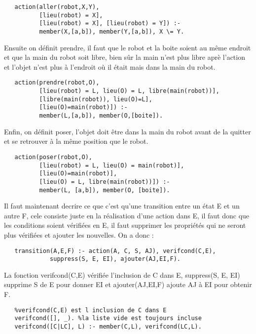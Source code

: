 \documentclass[a4paper,10pt]{article}
\begin{document}
  \begin{lstlisting}
   action(aller(robot,X,Y), 
          [lieu(robot) = X], 
          [lieu(robot) = X], [lieu(robot) = Y]) :-
	      member(X,[a,b]), member(Y,[a,b]), X \= Y.
  \end{lstlisting}
  
  Ensuite on d\'{e}finit prendre, il faut que le robot et la boite soient au m\^{e}me endroit et que la main du robot soit libre, bien s\^{u}r
  la main n'est plus libre apr\`{e} l'action et l'objet n'est plus \`{a} l'endroit o\`{u} il \'{e}tait mais dans la main du robot.
  
  \begin{lstlisting}
   action(prendre(robot,O), 
          [lieu(robot) = L, lieu(O) = L, libre(main(robot))], 
          [libre(main(robot)), lieu(O)=L], 
          [lieu(O)=main(robot)]) :-
	      member(L,[a,b]), member(O,[boite]).
  \end{lstlisting}
  
  Enfin, on d\'{e}finit poser, l'objet doit \^{e}tre dans la main du robot avant de la quitter et se retrouver \`{a} la m\^{e}me position que le robot.
  
  \begin{lstlisting}
   action(poser(robot,O), 
          [lieu(robot) = L, lieu(O) = main(robot)], 
          [lieu(O)=main(robot)], 
          [lieu(O) = L, libre(main(robot))]) :- 
	      member(L, [a,b]), member(O, [boite]).
  \end{lstlisting}
  
  Il faut maintenant decrire ce que c'est qu'une transition entre un \'{e}tat E et un autre F, cele consiste juste en la réalisation d'une action dans
  E, il faut donc que les conditions soient v\'{e}rifi\'{e}es en E, il faut supprimer les propri\'{e}t\'{e}s qui ne seront plus v\'{e}rifi\'{e}es et 
  ajouter les nouvelles. On a donc :
  
  \begin{lstlisting}
   transition(A,E,F) :- action(A, C, S, AJ), verifcond(C,E), 
			 suppress(S, E, EI), ajouter(AJ,EI,F).
  \end{lstlisting}
  
  La fonction verifcond(C,E) v\'{e}rifi\'{e}e l'inclusion de C dans E, suppress(S, E, EI) supprime S de E pour donner EI et ajouter(AJ,EI,F)
  ajoute AJ \`{a} EI pour obtenir F.
  
  \begin{lstlisting}
   %verifcond(C,E) est l inclusion de C dans E
   verifcond([], _). %la liste vide est toujours incluse
   verifcond([C|LC], L) :- member(C,L), verifcond(LC,L).
  \end{lstlisting}
  
\end{document}
